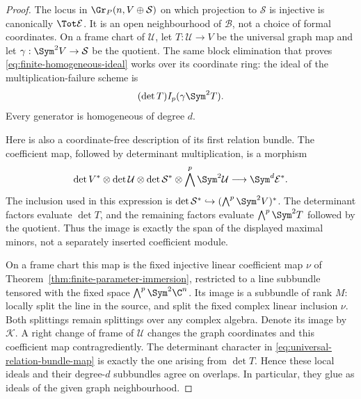 \begin{proof}
The locus in \(\Gr_P(n,V\oplus\mathcal S)\) on which projection
to \(\mathcal S\) is injective is canonically \(\Tot\mathcal E\).
It is an open neighbourhood of \(\mathcal B\), not a choice of
formal coordinates.  On a frame chart of \(\mathcal U\), let
\(T:\mathcal U\to V\) be the universal graph map and let
\(\gamma:\Sym^2V\to\mathcal S\) be the quotient.  The same
block elimination that proves
\eqref{eq:finite-homogeneous-ideal} works over its coordinate ring:
the ideal of the multiplication-failure scheme is
\[
                   (\det T)I_p(\gamma\Sym^2T).
\]
Every generator is homogeneous of degree \(d\).

Here is also a coordinate-free description of its first relation
bundle.  The coefficient map, followed by determinant multiplication,
is a morphism
\begin{equation}\label{eq:universal-relation-bundle-map}
 \det V^*\otimes\det\mathcal U\otimes\det\mathcal S^*
       \otimes\bigwedge^p\Sym^2\mathcal U
 \longrightarrow \Sym^d\mathcal E^*.
\end{equation}
The inclusion used in this expression is
\(\det\mathcal S^*\hookrightarrow(\bigwedge^p\Sym^2V)^*\).
The determinant factors evaluate \(\det T\), and the remaining
factors evaluate \(\bigwedge^p\Sym^2T\) followed by the quotient.
Thus the image is exactly the span of the displayed maximal minors,
not a separately inserted coefficient module.

On a frame chart this map is the fixed injective linear coefficient
map \(\nu\) of Theorem~\ref{thm:finite-parameter-immersion},
restricted to a line subbundle tensored with the fixed space
\(\bigwedge^p\Sym^2\C^n\).  Its image is a subbundle of rank
\(M\): locally split the line in the source, and split the fixed
complex linear inclusion \(\nu\).  Both splittings remain
splittings over any complex algebra.  Denote its image by
\(\mathcal K\).  A right change of frame of \(\mathcal U\)
changes the graph coordinates and this coefficient map
contragrediently.  The determinant character in
\eqref{eq:universal-relation-bundle-map} is exactly the one arising
from \(\det T\).  Hence these local ideals and their degree-\(d\)
subbundles agree on overlaps.  In particular, they glue as ideals
of the given graph neighbourhood.


\end{proof}
